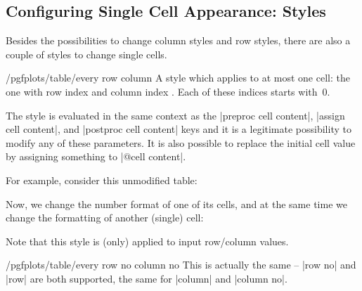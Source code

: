 \documentclass[a4paper]{ltxdoc}
\begin{document}
\subsection{Configuring Single Cell Appearance: Styles}

Besides the possibilities to change column styles and row styles, there are
also a couple of styles to change single cells.

\begin{stylekey}{/pgfplots/table/every row  column }
    A style which applies to at most one cell: the one with row index
     and column index . Each of these indices
    starts with~$0$.

    The style is evaluated in the same context as the |preproc cell content|,
    |assign cell content|, and |postproc cell content| keys and it is a
    legitimate possibility to modify any of these parameters. It is also
    possible to replace the initial cell value by assigning something to
    |@cell content|.

    For example, consider this unmodified table:
\begin{codeexample}[]
\end{codeexample}

    Now, we change the number format of one of its cells, and at the same time
    we change the formatting of another (single) cell:
\begin{codeexample}[]
\end{codeexample}
    Note that this style is (only) applied to input row/column values.
\end{stylekey}

\begin{stylekey}{/pgfplots/table/every row no  column no }
    This is actually the same -- |row no| and |row| are both supported, the
    same for |column| and |column no|.
\end{stylekey}
\end{document}
